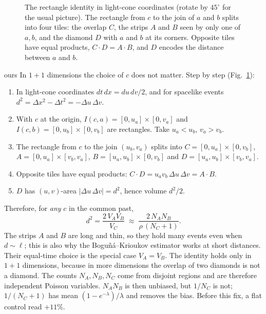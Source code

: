 \documentclass[11pt,a4paper]{article}
\newcommand{\tagbox}[2]{\textsf{\scriptsize\colorbox{#1!12}{\textcolor{#1!70!black}{#2}}}}
\newcommand{\ours}{\tagbox{orange}{ours}}
\begin{document}
\begin{figure}[t]
\centering
{}
\caption{The rectangle identity in light-cone coordinates (rotate by $45^\circ$ for the usual picture). The rectangle from $c$ to the join of $a$ and $b$ splits into four tiles: the overlap $C$, the strips $A$ and $B$ seen by only one of $a,b$, and the diamond $D$ with $a$ and $b$ at its corners. Opposite tiles have equal products, $C\cdot D=A\cdot B$, and $D$ encodes the distance between $a$ and $b$.}
\label{fig:tiles}
\end{figure}

\ours{} In $1+1$ dimensions the choice of $c$ does not matter. Step by step (Fig.~\ref{fig:tiles}):
\begin{enumerate}[leftmargin=*,itemsep=1pt]
\item In light-cone coordinates $dt\,dx=du\,dv/2$, and for spacelike events $d^2=\Delta x^2-\Delta t^2=-\Delta u\,\Delta v$.
\item With $c$ at the origin, $I(c,a)=[0,u_a]\times[0,v_a]$ and $I(c,b)=[0,u_b]\times[0,v_b]$ are rectangles. Take $u_a<u_b$, $v_a>v_b$.
\item The rectangle from $c$ to the join $(u_b,v_a)$ splits into $C=[0,u_a]\times[0,v_b]$, $A=[0,u_a]\times[v_b,v_a]$, $B=[u_a,u_b]\times[0,v_b]$ and $D=[u_a,u_b]\times[v_b,v_a]$.
\item Opposite tiles have equal products: $C\cdot D=u_av_b\,\Delta u\,\Delta v=A\cdot B$.
\item $D$ has $(u,v)$-area $|\Delta u\,\Delta v|=d^2$, hence volume $d^2/2$.
\end{enumerate}
Therefore, for \emph{any} $c$ in the common past,
\begin{equation}
d^2=\frac{2\,V_AV_B}{V_C}\;\approx\;\frac{2\,N_AN_B}{\rho\,(N_C+1)} .
\label{eq:rect}
\end{equation}
The strips $A$ and $B$ are long and thin, so they hold many events even when $d\sim\ell$; this is also why the Boguñá--Krioukov estimator works at short distances. Their equal-time choice is the special case $V_A=V_B$. The identity holds only in $1+1$ dimensions, because in more dimensions the overlap of two diamonds is not a diamond. The counts $N_A,N_B,N_C$ come from disjoint regions and are therefore independent Poisson variables. $N_AN_B$ is then unbiased, but $1/N_C$ is not; $1/(N_C+1)$ has mean $(1-e^{-\lambda})/\lambda$ and removes the bias. Before this fix, a flat control read $+11\%$.
\end{document}
